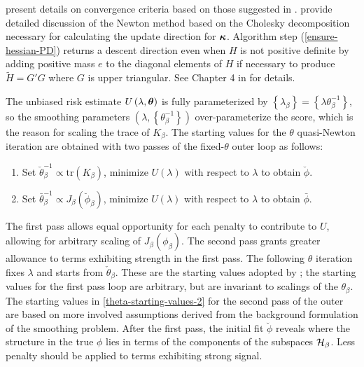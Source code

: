 \cite{gu1991minimizing} present details on convergence criteria based on those suggested in \cite{gill1981practical}. \cite{gill1981practical} provide detailed discussion of the Newton method based on the Cholesky decomposition necessary for calculating the update direction for $\mbox{\boldmath $\kappa$}$. Algorithm step (\ref{ensure-hessian-PD}) returns a descent direction even when $H$ is not positive definite by adding positive mass $e$ to the diagonal elements of $H$ if necessary to produce $\tilde{H} = G'G$ where $G$ is upper triangular. See Chapter 4 in \cite{gill1981practical} for details. 

\bigskip

The unbiased risk estimate $U\left(\lambda, \mbox{\boldmath $\theta$}\right)$ is fully parameterized by $\left\{\lambda_\beta \right\} = \left\{\lambda \theta^{-1}_\beta \right\}$, so the smoothing parameters $\left(\lambda, \left\{\theta^{-1}_\beta \right\}\right)$ over-parameterize the score, which is the reason for scaling the trace of $K_\beta$. The starting values for the $\theta$ quasi-Newton iteration are obtained with two passes of the fixed-$\theta$ outer loop as follows:
\begin{enumerate}
\item Set $\breve{\theta}_\beta^{-1} \propto \mbox{tr}\left( K_\beta \right)$, minimize $U\left(\lambda\right)$ with respect to $\lambda$ to obtain $\breve{\phi}$. \label{theta-starting-values-1}
\item Set $\bar{\theta}_\beta^{-1} \propto  J_\beta\left(\breve{\phi}_\beta \right)$, minimize $U\left(\lambda\right)$ with respect to $\lambda$ to obtain $\bar{\phi}$. \label{theta-starting-values-2}
\end{enumerate}
\noindent
The first pass allows equal opportunity for each penalty to contribute to $U$, allowing for arbitrary scaling of $J_\beta \left(\phi_\beta\right)$. The second pass grants greater allowance to terms exhibiting strength in the first pass. The following $\theta$ iteration fixes $\lambda$ and starts from $\check{\theta}_\beta$. These are the starting values adopted by \cite{gu1991minimizing}; the starting values for the first pass loop are arbitrary, but are invariant to scalings of the $\theta_\beta$. The starting values in \ref{theta-starting-values-2} for the second pass of the outer are based on more involved assumptions derived from the background formulation of the smoothing problem. After the first pass, the initial fit $\breve{\phi}$ reveals where the structure in the true $\phi$ lies in terms of the components of the subspaces $\mathcal{H}_\beta$. Less penalty should be applied to terms exhibiting strong signal.   %



